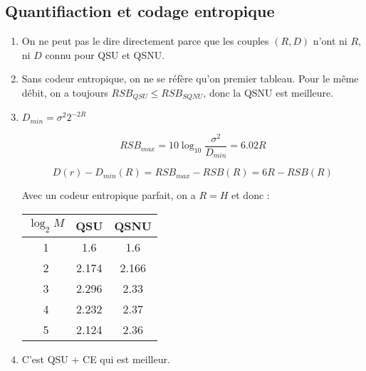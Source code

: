 \documentclass{../../td}
\begin{document}
\subsection{Quantifiaction et codage entropique}
\begin{enumerate}\setlength{\itemsep}{5mm}

\item On ne peut pas le dire directement parce que les couples $(R,D)$ n'ont ni $R$, ni $D$ connu pour QSU et QSNU.

\item Sans codeur entropique, on ne se réfère qu'on premier tableau. Pour le même débit, on a toujours $RSB_{QSU} \leq RSB_{SQNU}$, donc la QSNU est meilleure.

\item $D_{min} = \sigma^2 2^{-2R}$

\[RSB_{max} = 10\log_{10} \frac{\sigma^2}{D_{min}} = 6.02R\]

\[D(r) - D_{min}(R) = RSB_{max} - RSB(R) = 6R - RSB(R)\]

Avec un codeur entropique parfait, on a $R=H$ et donc :

\begin{center}
\begin{tabular}{c|c|c}
$\log_2 M$ &  QSU & QSNU \\
\hline
1 & 1.6 & 1.6 \\
2 & 2.174 & 2.166 \\
3 & 2.296 & 2.33 \\
4 & 2.232 & 2.37 \\
5 & 2.124 & 2.36 
\end{tabular} 
\end{center}

\item C'est QSU + CE qui est meilleur.
\end{enumerate}
\end{document}
